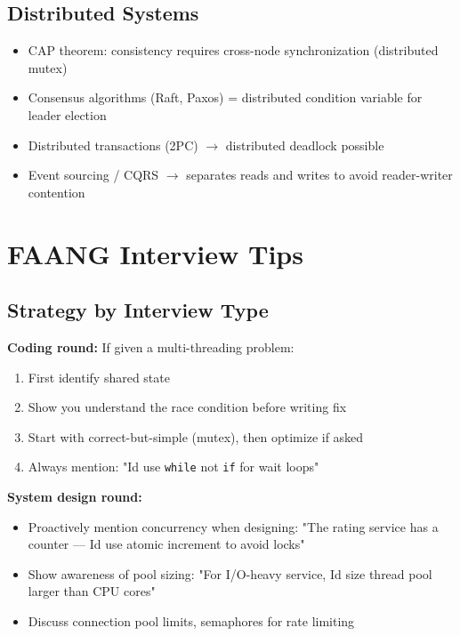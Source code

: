 \documentclass[11pt]{article}
\providecommand{\tightlist}{\setlength{\itemsep}{1pt}\setlength{\parskip}{0pt}}
\begin{document}
\subsection{Distributed Systems}\label{distributed-systems}

\begin{itemize}
\tightlist
\item
  CAP theorem: consistency requires cross-node synchronization (distributed mutex)
\item
  Consensus algorithms (Raft, Paxos) = distributed condition variable for leader election
\item
  Distributed transactions (2PC) \(\rightarrow\) distributed deadlock possible
\item
  Event sourcing / CQRS \(\rightarrow\) separates reads and writes to avoid reader-writer contention
\end{itemize}

\section{FAANG Interview Tips}\label{faang-interview-tips}

\subsection{Strategy by Interview Type}\label{strategy-by-interview-type}

\textbf{Coding round:} If given a multi-threading problem:

\begin{enumerate}
\def\labelenumi{\arabic{enumi}.}
\tightlist
\item
  First identify shared state
\item
  Show you understand the race condition before writing fix
\item
  Start with correct-but-simple (mutex), then optimize if asked
\item
  Always mention: "I\textquotesingle d use \texttt{while} not \texttt{if} for wait loops"
\end{enumerate}

\textbf{System design round:}

\begin{itemize}
\tightlist
\item
  Proactively mention concurrency when designing: "The rating service has a counter --- I\textquotesingle d use atomic increment to avoid locks"
\item
  Show awareness of pool sizing: "For I/O-heavy service, I\textquotesingle d size thread pool larger than CPU cores"
\item
  Discuss connection pool limits, semaphores for rate limiting
\end{itemize}
\end{document}
